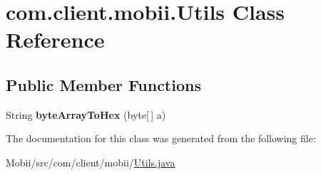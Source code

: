 \hypertarget{classcom_1_1client_1_1mobii_1_1_utils}{\section{com.\-client.\-mobii.\-Utils Class Reference}
\label{classcom_1_1client_1_1mobii_1_1_utils}
}
\subsection*{Public Member Functions}
\begin{DoxyCompactItemize}
\item 
\hypertarget{classcom_1_1client_1_1mobii_1_1_utils_a5a1d8ff6f3769d2e21cd062ffdbae4c3}{String {\bfseries byte\-Array\-To\-Hex} (byte\mbox{[}$\,$\mbox{]} a)}\label{classcom_1_1client_1_1mobii_1_1_utils_a5a1d8ff6f3769d2e21cd062ffdbae4c3}

\end{DoxyCompactItemize}


The documentation for this class was generated from the following file\-:\begin{DoxyCompactItemize}
\item 
Mobii/src/com/client/mobii/\hyperlink{_utils_8java}{Utils.\-java}\end{DoxyCompactItemize}
